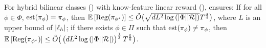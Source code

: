 \begin{theorem}\label{thm: bilinear-adv}
For hybrid bilinear classes () with know-feature linear reward (),   ensures: 
 If for all $\phi\in\Phi$, $\operatorname*{est}(\pi_\phi) = \pi_\phi$, then $\mathbb{E}\left[\text{\rm Reg}(\pi_{\phi^\star})\right] \le \tilde{O}\big(\sqrt{dL^2\log\left(|\Phi||\mathcal{R}|\right)}T^{\frac{3}{4}}\big)$, where $L$ is an upper bound of $|\ell_h|$; if there exists $\phi\in\Pi$ such that $\operatorname*{est}(\pi_\phi) \neq \pi_\phi$, then $\mathbb{E}\left[\text{\rm Reg}(\pi_{\phi^\star})\right]\le \tilde{O}\big(\left(dL^2\log\left(|\Phi||\mathcal{R}|\right)\right)^{\frac{1}{3}}T^{\frac{5}{6}}\big)$.
\label{thm:mf-f}
\end{theorem}

